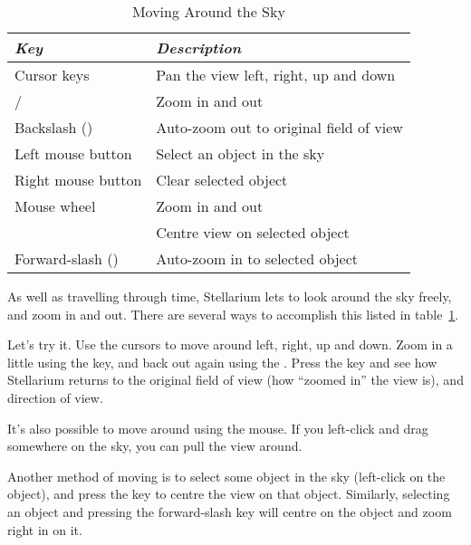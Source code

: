 \begin{table}[h]
\centering
\begin{tabular}{ll}\toprule
\emph{Key}                         & \emph{Description}\\\midrule
Cursor keys \keys{\arrowkeyleft} \keys{\arrowkeyright} \keys{\arrowkeyup} \keys{\arrowkeydown} & Pan the view left, right, up and down \\
\keyPageUp{}/\keyPageDown{}        & Zoom in and out \\
Backslash (\key{\textbackslash{}}) & Auto-zoom out to original field of view \\
Left mouse button                  & Select an object in the sky \\
Right mouse button                 & Clear selected object \\
Mouse wheel                        & Zoom in and out \\ 
\key{\space}                       & Centre view on selected object \\
Forward-slash (\key{/})            & Auto-zoom in to selected object \\
\bottomrule
\end{tabular}
\caption{Moving Around the Sky}
\label{tab:tour:moving}
\end{table}

As well as travelling through time, Stellarium lets to look around the
sky freely, and zoom in and out. There are several ways to accomplish
this listed in table~\ref{tab:tour:moving}.

Let's try it. Use the cursors to move around left, right, up and down.
Zoom in a little using the \keyPageUp{} key, and back out again using the
\keyPageDown{}. Press the \key{\textbackslash} key and see how Stellarium returns to the
original field of view (how ``zoomed in'' the view is), and direction of
view.

It's also possible to move around using the mouse. If you left-click and
drag somewhere on the sky, you can pull the view around.

Another method of moving is to select some object in the sky (left-click
on the object), and press the  key to centre the view on that
object. Similarly, selecting an object and pressing the forward-slash
key \key{/} will centre on the object and zoom right in on it.

